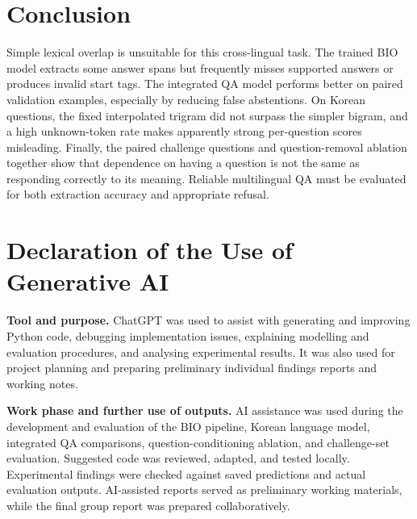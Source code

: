 \documentclass[11pt,a4paper,twocolumn]{article}
\begin{document}
\section{Conclusion}
Simple lexical overlap is unsuitable for this cross-lingual task. The trained BIO model extracts some answer spans but frequently misses supported answers or produces invalid start tags. The integrated QA model performs better on paired validation examples, especially by reducing false abstentions. On Korean questions, the fixed interpolated trigram did not surpass the simpler bigram, and a high unknown-token rate makes apparently strong per-question scores misleading. Finally, the paired challenge questions and question-removal ablation together show that dependence on having a question is not the same as responding correctly to its meaning. Reliable multilingual QA must be evaluated for both extraction accuracy and appropriate refusal.

\balance

\section{Declaration of the Use of Generative AI}

\textbf{Tool and purpose.}
ChatGPT was used to assist with generating and improving Python code, debugging implementation issues, explaining modelling and evaluation procedures, and analysing experimental results. It was also used for project planning and preparing preliminary individual findings reports and working notes.

\textbf{Work phase and further use of outputs.}
AI assistance was used during the development and evaluation of the BIO pipeline, Korean language model, integrated QA comparisons, question-conditioning ablation, and challenge-set evaluation. Suggested code was reviewed, adapted, and tested locally. Experimental findings were checked against saved predictions and actual evaluation outputs. AI-assisted reports served as preliminary working materials, while the final group report was prepared collaboratively.
\end{document}
